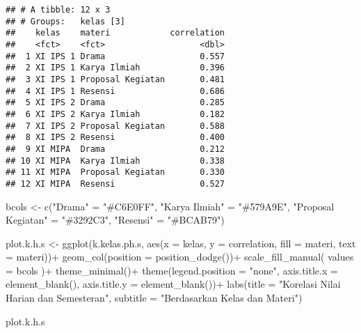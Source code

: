 \documentclass[
]{article}
\newenvironment{Shaded}{\begin{snugshade}}{\end{snugshade}}
\newcommand{\AttributeTok}[1]{\textcolor[rgb]{0.77,0.63,0.00}{#1}}
\newcommand{\FunctionTok}[1]{\textcolor[rgb]{0.00,0.00,0.00}{#1}}
\newcommand{\NormalTok}[1]{#1}
\newcommand{\OtherTok}[1]{\textcolor[rgb]{0.56,0.35,0.01}{#1}}
\newcommand{\SpecialCharTok}[1]{\textcolor[rgb]{0.00,0.00,0.00}{#1}}
\newcommand{\StringTok}[1]{\textcolor[rgb]{0.31,0.60,0.02}{#1}}
\begin{document}
\begin{verbatim}
## # A tibble: 12 x 3
## # Groups:   kelas [3]
##    kelas    materi            correlation
##    <fct>    <fct>                   <dbl>
##  1 XI IPS 1 Drama                   0.557
##  2 XI IPS 1 Karya Ilmiah            0.396
##  3 XI IPS 1 Proposal Kegiatan       0.481
##  4 XI IPS 1 Resensi                 0.686
##  5 XI IPS 2 Drama                   0.285
##  6 XI IPS 2 Karya Ilmiah            0.182
##  7 XI IPS 2 Proposal Kegiatan       0.588
##  8 XI IPS 2 Resensi                 0.400
##  9 XI MIPA  Drama                   0.212
## 10 XI MIPA  Karya Ilmiah            0.338
## 11 XI MIPA  Proposal Kegiatan       0.330
## 12 XI MIPA  Resensi                 0.527
\end{verbatim}

\begin{Shaded}
\begin{Highlighting}[]
\NormalTok{bcols }\OtherTok{\textless{}{-}} \FunctionTok{c}\NormalTok{(}\StringTok{"Drama"} \OtherTok{=} \StringTok{"\#C6E0FF"}\NormalTok{, }
           \StringTok{"Karya Ilmiah"} \OtherTok{=} \StringTok{"\#579A9E"}\NormalTok{,}
           \StringTok{"Proposal Kegiatan"} \OtherTok{=} \StringTok{"\#3292C3"}\NormalTok{,}
           \StringTok{"Resensi"} \OtherTok{=} \StringTok{"\#BCAB79"}\NormalTok{)}

\NormalTok{plot.k.h.s }\OtherTok{\textless{}{-}}
\FunctionTok{ggplot}\NormalTok{(k.kelas.ph.s, }\FunctionTok{aes}\NormalTok{(}\AttributeTok{x =}\NormalTok{ kelas, }
                         \AttributeTok{y =}\NormalTok{ correlation,}
                         \AttributeTok{fill =}\NormalTok{ materi,}
                         \AttributeTok{text =}\NormalTok{ materi))}\SpecialCharTok{+}
  \FunctionTok{geom\_col}\NormalTok{(}\AttributeTok{position =} \FunctionTok{position\_dodge}\NormalTok{())}\SpecialCharTok{+}
  \FunctionTok{scale\_fill\_manual}\NormalTok{(}
    \AttributeTok{values =}\NormalTok{ bcols}
\NormalTok{  )}\SpecialCharTok{+}
  \FunctionTok{theme\_minimal}\NormalTok{()}\SpecialCharTok{+}
  \FunctionTok{theme}\NormalTok{(}\AttributeTok{legend.position =} \StringTok{"none"}\NormalTok{,}
        \AttributeTok{axis.title.x =} \FunctionTok{element\_blank}\NormalTok{(),}
        \AttributeTok{axis.title.y =} \FunctionTok{element\_blank}\NormalTok{())}\SpecialCharTok{+}
  \FunctionTok{labs}\NormalTok{(}\AttributeTok{title =} \StringTok{"Korelasi Nilai Harian dan Semesteran"}\NormalTok{,}
       \AttributeTok{subtitle =} \StringTok{"Berdasarkan Kelas dan Materi"}\NormalTok{)}
  

\NormalTok{plot.k.h.s}
\end{Highlighting}
\end{Shaded}
\end{document}
